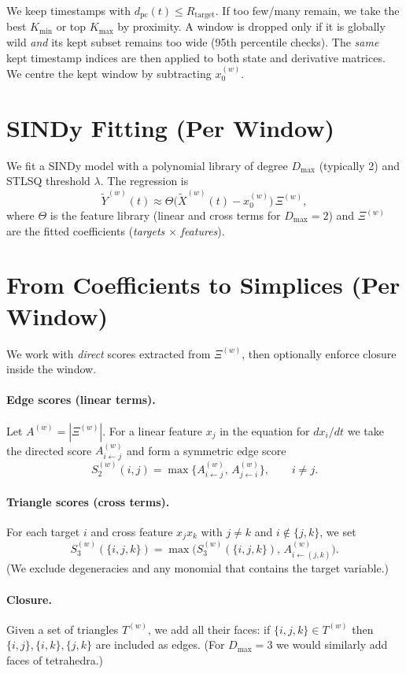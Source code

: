 \documentclass[11pt]{article}
\begin{document}
We keep timestamps with \(d_{\mathrm{pc}}(t)\le R_{\text{target}}\). If too few/many remain, we take the best \(K_{\min}\) or top \(K_{\max}\) by proximity. A window is dropped only if it is globally wild \emph{and} its kept subset remains too wide (95th percentile checks). The \emph{same} kept timestamp indices are then applied to both state and derivative matrices. We centre the kept window by subtracting \(x_0^{(w)}\).

\section{SINDy Fitting (Per Window)}
We fit a SINDy model with a polynomial library of degree \(D_{\max}\) (typically 2) and STLSQ threshold \(\lambda\). The regression is
\[
\tilde Y^{(w)}(t) \approx \Theta\big(\tilde X^{(w)}(t)-x_0^{(w)}\big)\,\Xi^{(w)},
\]
where \(\Theta\) is the feature library (linear and cross terms for \(D_{\max}=2\)) and \(\Xi^{(w)}\) are the fitted coefficients (\emph{targets} $\times$ \emph{features}).

\section{From Coefficients to Simplices (Per Window)}
We work with \emph{direct} scores extracted from \(\Xi^{(w)}\), then optionally enforce closure inside the window.

\paragraph{Edge scores (linear terms).}
Let \(A^{(w)} = |\Xi^{(w)}|\). For a linear feature \(x_j\) in the equation for \(d x_i/dt\) we take the directed score \(A^{(w)}_{i\leftarrow j}\) and form a symmetric edge score
\[
S^{(w)}_2(i,j) = \max\big\{A^{(w)}_{i\leftarrow j},\, A^{(w)}_{j\leftarrow i}\big\},\qquad i\neq j.
\]

\paragraph{Triangle scores (cross terms).}
For each target \(i\) and cross feature \(x_j x_k\) with \(j\neq k\) and \(i\notin\{j,k\}\), we set
\[
S^{(w)}_3(\{i,j,k\}) = \max\big(S^{(w)}_3(\{i,j,k\}),\, A^{(w)}_{i\leftarrow (j,k)}\big).
\]
(We exclude degeneracies and any monomial that contains the target variable.)

\paragraph{Closure.}
Given a set of triangles \(T^{(w)}\), we add all their faces: if \(\{i,j,k\}\in T^{(w)}\) then \(\{i,j\},\{i,k\},\{j,k\}\) are included as edges. (For \(D_{\max}=3\) we would similarly add faces of tetrahedra.)
\end{document}

